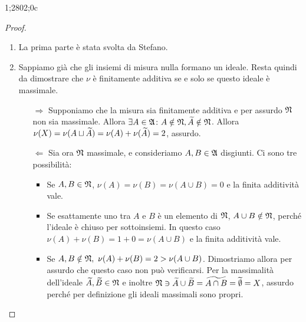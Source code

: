 1;2802;0c\documentclass[../EserciziIstituzioniAnalisi.tex]{subfiles}
\begin{document}
\begin{proof}
  \begin{enumerate}
    \item La prima parte è stata svolta da Stefano.
    \item Sappiamo già che gli insiemi di misura nulla formano un ideale. Resta quindi da dimostrare che $\nu$ è finitamente additiva se e solo se questo ideale è massimale.
    \begin{itemize}
      \item[$\Rightarrow$] Supponiamo che la misura sia finitamente additiva e per assurdo $\mathfrak N$ non sia massimale. Allora $\exists A\in\mathfrak A \colon A\notin \mathfrak N, \widetilde{A}\notin\mathfrak N$. Allora $\nu(X)=\nu(A\sqcup \widetilde{A})=\nu(A)+\nu (\widetilde{A})=2$, assurdo.
      \item[$\Leftarrow$] Sia ora $\mathfrak N$ massimale, e consideriamo $A,B\in\mathfrak A$ disgiunti. Ci sono tre possibilità:
      \begin{itemize}
        \item Se $A,B\in\mathfrak N$, $\nu(A)=\nu(B)=\nu(A \cup B)=0$ e la finita additività vale.
        \item Se esattamente uno tra $A$ e $B$ è un elemento di $\mathfrak N$, $A\cup B \notin \mathfrak N$, perché l'ideale è chiuso per sottoinsiemi. In questo caso $\nu(A)+\nu(B)=1+0=\nu(A \cup B)$ e la finita additività vale.
        \item Se $A,B\notin\gN,\ \nu(A)+\nu(B)=2>\nu(A \cup B)$. Dimostriamo allora per assurdo che questo caso non può verificarsi. Per la massimalità dell'ideale $\widetilde{A},\widetilde{B}\in\mathfrak N$ e  inoltre $\mathfrak N \ni \widetilde{A} \cup \widetilde{B}=\widetilde{A\cap B}=\widetilde{\emptyset}=X$, assurdo perché per definizione gli ideali massimali sono propri.
      \end{itemize}
    \end{itemize}
  \end{enumerate}
\end{proof}
\end{document}
